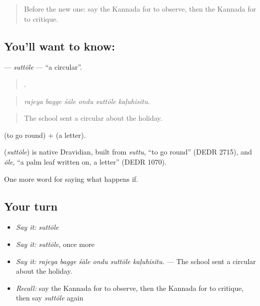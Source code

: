 \label{lesson:KA-C424-suttole}



\begin{quote}
Before the new one: say the Kannada for to observe, then the Kannada for to critique.
\end{quote}

\subsection*{You'll want to know: }
\textbf{} — \emph{suttōle} — \textquotedblleft{}a circular\textquotedblright{}.

\begin{quote}
     .
\end{quote}

\begin{quote}
\emph{rajeya bagge śāle ondu suttōle kaḷuhisitu.}
\end{quote}

\begin{quote}
The school sent a circular about the holiday.
\end{quote}

 (to go round) +  (a letter).

\begin{cousinweb}
\textbf{} (\emph{suttōle}) is native Dravidian, built from \emph{suttu}, \textquotedblleft{}to go round\textquotedblright{} (DEDR 2715), and \emph{ōle}, \textquotedblleft{}a palm leaf written on, a letter\textquotedblright{} (DEDR 1070).
\end{cousinweb}

\begin{grammarlens}[title={What you've built}]
One more word for saying what happens if.
\end{grammarlens}

\subsection*{Your turn}
\begin{itemize}
\raggedright
  \item \emph{Say it:} \emph{suttōle}
  \item \emph{Say it:} \emph{suttōle}, once more
  \item \emph{Say it:} \emph{rajeya bagge śāle ondu suttōle kaḷuhisitu.} — The school sent a circular about the holiday.
  \item \emph{Recall:} say the Kannada for to observe, then the Kannada for to critique, then say \emph{suttōle} again
\end{itemize}

